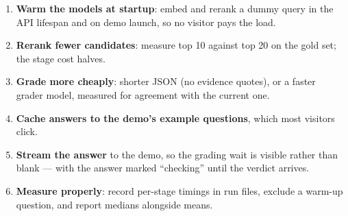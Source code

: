 \begin{recommended}
\begin{enumerate}
  \item \textbf{Warm the models at startup}: embed and rerank a dummy query in the API lifespan and on demo launch, so no visitor pays the load.
  \item \textbf{Rerank fewer candidates}: measure top 10 against top 20 on the gold set; the stage cost halves.
  \item \textbf{Grade more cheaply}: shorter JSON (no evidence quotes), or a faster grader model, measured for agreement with the current one.
  \item \textbf{Cache answers to the demo's example questions}, which most visitors click.
  \item \textbf{Stream the answer} to the demo, so the grading wait is visible rather than blank --- with the answer marked \enquote{checking} until the verdict arrives.
  \item \textbf{Measure properly}: record per-stage timings in run files, exclude a warm-up question, and report medians alongside means.
\end{enumerate}
\end{recommended}
